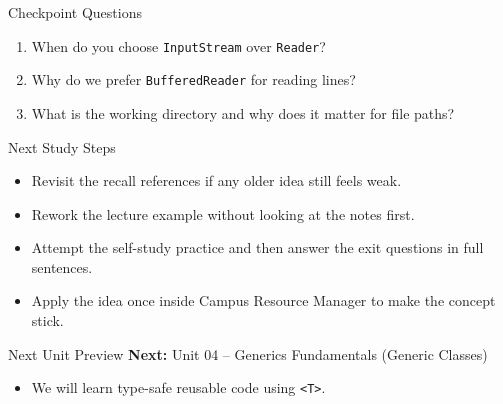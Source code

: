 \documentclass{beamer}
\begin{document}
\begin{frame}{Checkpoint Questions}
  \begin{enumerate}[<+->]
    \item When do you choose \texttt{InputStream} over \texttt{Reader}?
    \item Why do we prefer \texttt{BufferedReader} for reading lines?
    \item What is the working directory and why does it matter for file paths?
  \end{enumerate}
  \slidesources{\OOPSUnitIIISources}
\end{frame}

\begin{frame}{Next Study Steps}
\begin{itemize}[<+->]
  \item Revisit the recall references if any older idea still feels weak.
  \item Rework the lecture example without looking at the notes first.
  \item Attempt the self-study practice and then answer the exit questions in full sentences.
  \item Apply the idea once inside Campus Resource Manager to make the concept stick.
\end{itemize}
  \slidesources{\OOPSUnitIIISources}
\end{frame}

\begin{frame}{Next Unit Preview}
  \textbf{Next:} Unit 04 -- Generics Fundamentals (Generic Classes)
  \vspace{0.6em}
  \begin{itemize}[<+->]
    \item We will learn type-safe reusable code using \texttt{<T>}.
  \end{itemize}
  \slidesources{\OOPSUnitIIISources}
\end{frame}
\end{document}
